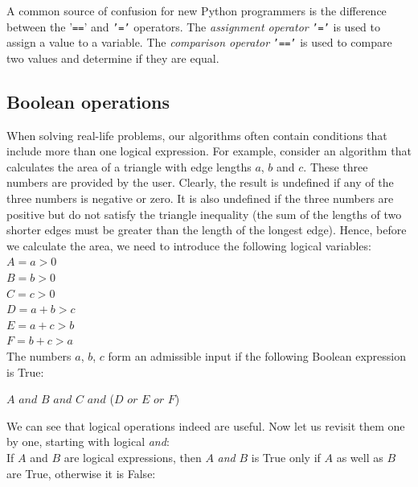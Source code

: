 \documentclass[article,A4,12pt]{llncs}
\begin{document}
\begin{gbox}
A common source of confusion for new Python programmers is the difference between the '{\tt ==}' and {\tt '='} operators. The {\em assignment operator} {\tt '='} is used to assign a value to a variable. The {\em comparison operator} {\tt '=='} is used to compare two values and determine if they are equal. 
\end{gbox}

\subsection{Boolean operations}\label{subsec:boolop}

When solving real-life problems, our algorithms often 
contain conditions that include more than one logical 
expression. For example, consider an algorithm that 
calculates the area of a triangle with edge
lengths $a$, $b$ and $c$. These three numbers are provided by 
the user. Clearly, the result is undefined if any of the three
numbers is negative or zero. It is also undefined if 
the three numbers are positive but do not satisfy the 
triangle inequality (the sum of the lengths of two shorter edges 
must be greater than the length of the longest edge).
Hence, before we calculate the area, we need to introduce the 
following logical variables:\\

\noindent
$A = a > 0$\\
$B = b > 0$\\
$C = c > 0$\\
$D = a + b > c$\\
$E = a + c > b$\\
$F = b + c > a$\\

\noindent
The numbers $a$, $b$, $c$ form an admissible input if the following 
Boolean expression is True:\\

\noindent
\begin{center}
$A$ $and$ $B$ $and$ $C$ $and$ ($D$ $or$ $E$ $or$ $F$) \\
\end{center}

\noindent
We can see that logical operations indeed are useful. Now let us revisit them 
one by one, starting with logical {\em and}:\\

\noindent 
If $A$ and $B$ are logical expressions, then $A$ {\em and} $B$
is True only if $A$ as well as $B$ are True, otherwise it is False:\\
\end{document}
